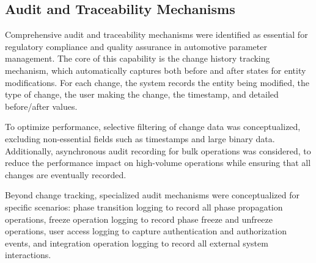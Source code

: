 \subsection{Audit and Traceability Mechanisms}
\label{subsec:audit-mechanisms}

Comprehensive audit and traceability mechanisms were identified as essential for regulatory compliance and quality assurance in automotive parameter management. The core of this capability is the change history tracking mechanism, which automatically captures both before and after states for entity modifications. For each change, the system records the entity being modified, the type of change, the user making the change, the timestamp, and detailed before/after values.

To optimize performance, selective filtering of change data was conceptualized, excluding non-essential fields such as timestamps and large binary data. Additionally, asynchronous audit recording for bulk operations was considered, to reduce the performance impact on high-volume operations while ensuring that all changes are eventually recorded.

Beyond change tracking, specialized audit mechanisms were conceptualized for specific scenarios: phase transition logging to record all phase propagation operations, freeze operation logging to record phase freeze and unfreeze operations, user access logging to capture authentication and authorization events, and integration operation logging to record all external system interactions.